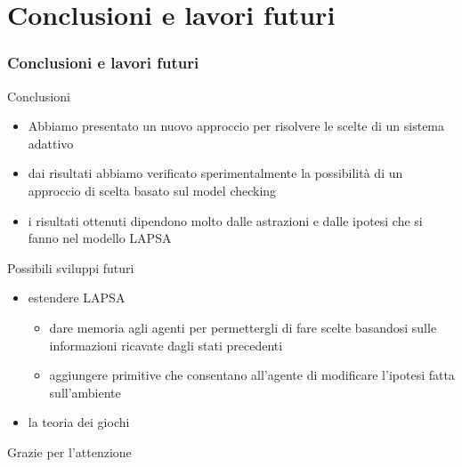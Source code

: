 \documentclass[10pt]{beamer}
\begin{document}
	\section{Conclusioni e lavori futuri}
	\begin{frame}
		\frametitle{Conclusioni e lavori futuri}
		\begin{block}{Conclusioni}
		\begin{itemize}
			\item Abbiamo presentato un nuovo approccio per risolvere le scelte di un sistema adattivo
			\item dai risultati abbiamo verificato sperimentalmente la possibilità di un approccio di scelta basato sul model checking
			\item i risultati ottenuti dipendono molto dalle astrazioni e dalle ipotesi che si fanno nel modello LAPSA
		\end{itemize}
		\end{block}
		\begin{block}{Possibili sviluppi futuri}
		\begin{itemize}
			\item estendere LAPSA
			\begin{itemize}
				\item dare memoria agli agenti per permettergli di fare scelte basandosi sulle informazioni ricavate dagli stati precedenti
				\item aggiungere primitive che consentano all’agente di modificare l’ipotesi fatta sull’ambiente
			\end{itemize}
			\item la teoria dei giochi
		\end{itemize}
		\end{block}
	\end{frame}
	
	\begin{frame}
		\begin{block}{}
			\begin{center}
				Grazie per l'attenzione
			\end{center}
		\end{block}
	\end{frame}
	
\end{document}
